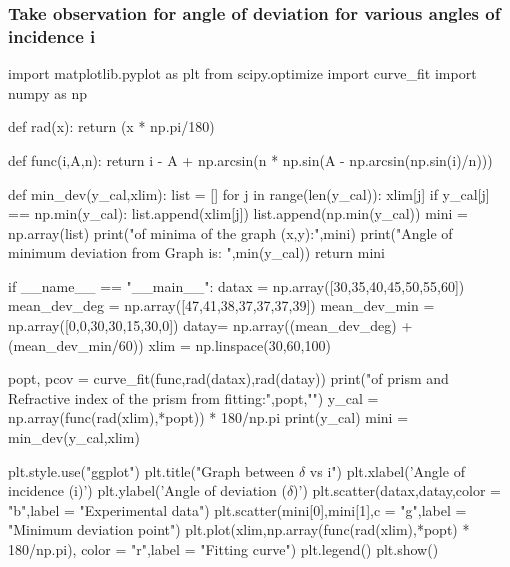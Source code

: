 \documentclass{article}
\begin{document}
\subsubsection{Take observation for angle of deviation for various angles of incidence i}

\begin{pycode}
  
 
import matplotlib.pyplot as plt
from scipy.optimize import curve_fit
import numpy as np

def rad(x):
    return (x * np.pi/180)

def func(i,A,n):
    return i - A + np.arcsin(n * np.sin(A - np.arcsin(np.sin(i)/n)))

def min_dev(y_cal,xlim):
    list = []
    for j in range(len(y_cal)):
        xlim[j]
        if y_cal[j] == np.min(y_cal):
            list.append(xlim[j])
            list.append(np.min(y_cal))
    mini = np.array(list)
    print("\nCoordinates of minima of the graph (x,y):\n",mini)
    print("\n Angle of minimum deviation from Graph is: ",min(y_cal))
    return mini


if __name__ == "__main__":
    datax = np.array([30,35,40,45,50,55,60])
    mean_dev_deg = np.array([47,41,38,37,37,37,39])
    mean_dev_min = np.array([0,0,30,30,15,30,0])
    datay= np.array((mean_dev_deg) + (mean_dev_min/60))
    xlim = np.linspace(30,60,100)

    popt, pcov = curve_fit(func,rad(datax),rad(datay))
    print("\nAngle of prism and Refractive index of the prism from fitting:\n",popt,"\n")
    y_cal = np.array(func(rad(xlim),*popt)) * 180/np.pi
    print(y_cal)
    mini = min_dev(y_cal,xlim)

    plt.style.use("ggplot")
    plt.title("Graph between $\delta$ vs i")
    plt.xlabel('Angle of incidence (i)')
    plt.ylabel('Angle of deviation ($\delta$)')
    plt.scatter(datax,datay,color = "b",label = "Experimental data")
    plt.scatter(mini[0],mini[1],c = "g",label = "Minimum deviation point")
    plt.plot(xlim,np.array(func(rad(xlim),*popt) * 180/np.pi), color = "r",label = "Fitting curve")
    plt.legend()
    plt.show()
\end{pycode}
\end{document}
